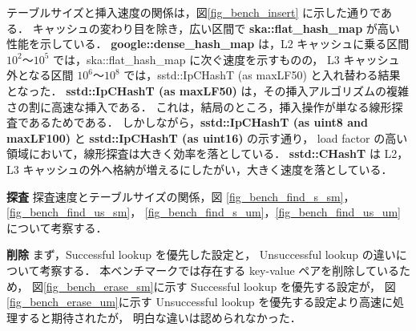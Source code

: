 テーブルサイズと挿入速度の関係は，図\ref{fig_bench_insert} に示した通りである．
キャッシュの変わり目を除き，広い区間で {\bf ska::flat\_hash\_map} が高い性能を示している．
{\bf google::dense\_hash\_map} は，L2 キャッシュに乗る区間 $10^2〜 10^5$ では，ska::flat\_hash\_map に次ぐ速度を示すものの，
L3 キャッシュ外となる区間 $10^6〜 10^8$ では，sstd::IpCHashT (as maxLF50) と入れ替わる結果となった．
{\bf sstd::IpCHashT (as maxLF50)} は，その挿入アルゴリズムの複雑さの割に高速な挿入である．
これは，結局のところ，挿入操作が単なる線形探査であるためである．
しかしながら，{\bf sstd::IpCHashT (as uint8 and maxLF100)} と {\bf sstd::IpCHashT (as uint16)} の示す通り，
load factor の高い領域において，線形探査は大きく効率を落としている．
{\bf sstd::CHashT} は L2，L3 キャッシュの外へ格納が増えるにしたがい，大きく速度を落としている．
\leavevmode \newline

%
{\bf 探査}
\samepage\newline\indent
探査速度とテーブルサイズの関係，図
\ref{fig_bench_find_s_sm}，\ref{fig_bench_find_us_sm}，
\ref{fig_bench_find_s_um}，\ref{fig_bench_find_us_um}について考察する．
\leavevmode \newline

%
{\bf 削除}
\samepage\newline\indent
まず，Successful lookup を優先した設定と，
Unsuccessful lookup の違いについて考察する．
本ベンチマークでは存在する key-value ペアを削除しているため，
図\ref{fig_bench_erase_sm}に示す Successful lookup を優先する設定が，
図\ref{fig_bench_erase_um}に示す Unsuccessful lookup を優先する設定より高速に処理すると期待されたが，
明白な違いは認められなかった．
\leavevmode \newline


